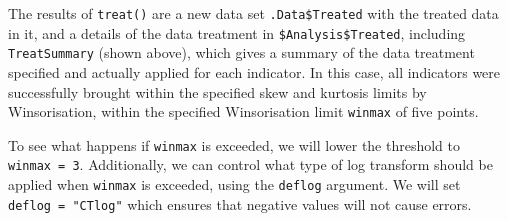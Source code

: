 \documentclass[
]{book}
\begin{document}
The results of \texttt{treat()} are a new data set \texttt{.Data\$Treated} with the treated data in it, and a details of the data treatment in \texttt{\$Analysis\$Treated}, including \texttt{TreatSummary} (shown above), which gives a summary of the data treatment specified and actually applied for each indicator. In this case, all indicators were successfully brought within the specified skew and kurtosis limits by Winsorisation, within the specified Winsorisation limit \texttt{winmax} of five points.

To see what happens if \texttt{winmax} is exceeded, we will lower the threshold to \texttt{winmax\ =\ 3}. Additionally, we can control what type of log transform should be applied when \texttt{winmax} is exceeded, using the \texttt{deflog} argument. We will set \texttt{deflog\ =\ "CTlog"} which ensures that negative values will not cause errors.
\end{document}
